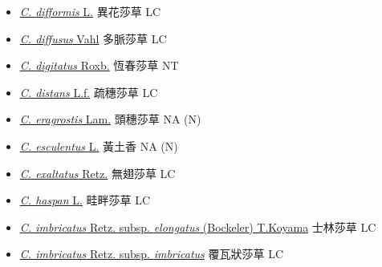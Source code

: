 \begin{itemize}
\begin{itemize}
        \item[] \href{http://www.theplantlist.org/tpl1.1/search?q=Cyperus+difformis}{\textit{C. difformis} L.}   異花莎草   LC
        \item[] \href{http://www.theplantlist.org/tpl1.1/search?q=Cyperus+diffusus}{\textit{C. diffusus} Vahl}   多脈莎草   LC
        \item[] \href{http://www.theplantlist.org/tpl1.1/search?q=Cyperus+digitatus}{\textit{C. digitatus} Roxb.}   恆春莎草   NT
        \item[] \href{http://www.theplantlist.org/tpl1.1/search?q=Cyperus+distans}{\textit{C. distans} L.f.}   疏穗莎草   LC
        \item[] \href{http://www.theplantlist.org/tpl1.1/search?q=Cyperus+eragrostis}{\textit{C. eragrostis} Lam.}   頭穗莎草   NA (N)
        \item[] \href{http://www.theplantlist.org/tpl1.1/search?q=Cyperus+esculentus}{\textit{C. esculentus} L.}   黃土香   NA (N)
        \item[] \href{http://www.theplantlist.org/tpl1.1/search?q=Cyperus+exaltatus}{\textit{C. exaltatus} Retz.}   無翅莎草   LC
        \item[] \href{http://www.theplantlist.org/tpl1.1/search?q=Cyperus+haspan}{\textit{C. haspan} L.}   畦畔莎草   LC
        \item[] \href{http://www.theplantlist.org/tpl1.1/search?q=Cyperus+imbricatus+subsp.+elongatus}{\textit{C. imbricatus} Retz. subsp. \textit{elongatus} (Bockeler) T.Koyama}   士林莎草   LC
        \item[] \href{http://www.theplantlist.org/tpl1.1/search?q=Cyperus+imbricatus+subsp.+imbricatus}{\textit{C. imbricatus} Retz. subsp. \textit{imbricatus}}   覆瓦狀莎草   LC

\end{itemize}
\end{itemize}

